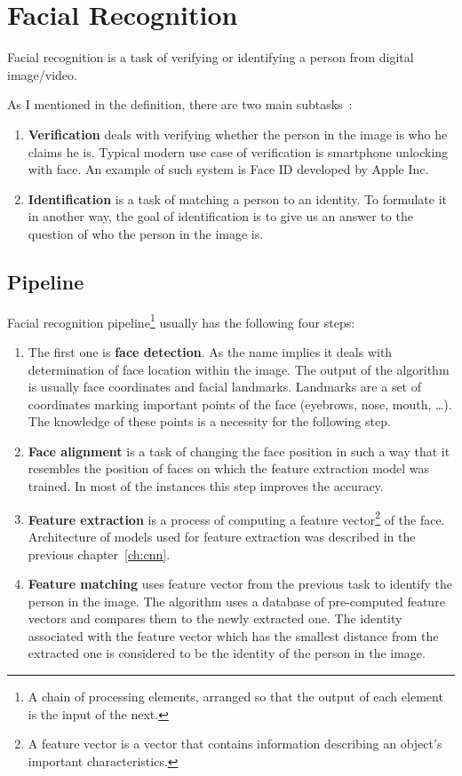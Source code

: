 \chapter{Facial Recognition}\label{ch:face-rec}
Facial recognition is a task of verifying or identifying a person from digital image/video.

As I mentioned in the definition, there are two main subtasks~\cite{FaceRec}:
\begin{enumerate}
    \item \textbf{Verification} deals with verifying whether the person in the image is who he claims he is.
    Typical modern use case of verification is smartphone unlocking with face.
    An example of such system is Face ID developed by Apple Inc.

    \item \textbf{Identification} is a task of matching a person to an identity.
    To formulate it in another way, the goal of identification is to give us an answer to the question of who the person
    in the image is.
\end{enumerate}

\section{Pipeline}\label{sec:pipeline}

Facial recognition pipeline\footnote{\label{foot:pipe}A chain of processing elements, arranged so that the output of
each element is the input of the next.} usually has the following four steps:
\begin{enumerate}
    \item The first one is \textbf{face detection}.
    As the name implies it deals with determination of face location within the image.
    The output of the algorithm is usually face coordinates and facial landmarks.
    Landmarks are a set of coordinates marking important points of the face (eyebrows, nose, mouth, \ldots).
    The knowledge of these points is a necessity for the following step.
    \item \textbf{Face alignment} is a task of changing the face position in such a way that it resembles the position
    of faces on which the feature extraction model was trained.
    In most of the instances this step improves the accuracy.
    \item \textbf{Feature extraction} is a process of computing a feature vector\footnote{A feature vector is a vector
    that contains information describing an object's important characteristics.} of the face.
    Architecture of models used for feature extraction was described in the previous chapter~\ref{ch:cnn}.
    \item \textbf{Feature matching} uses feature vector from the previous task to identify the person in the image.
    The algorithm uses a database of pre-computed feature vectors and compares them to the newly extracted one.
    The identity associated with the feature vector which has the smallest distance from the extracted one is
    considered to be the identity of the person in the image.
\end{enumerate}

